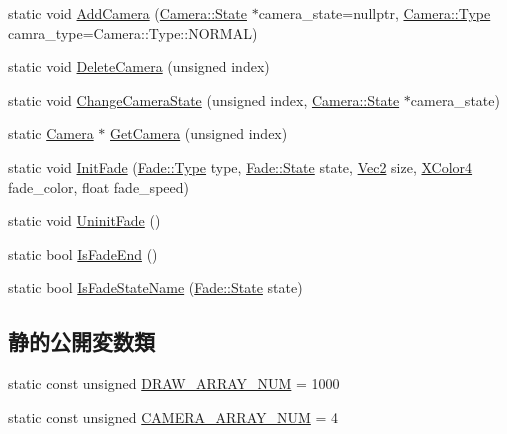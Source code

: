 \begin{DoxyCompactItemize}
\item 
static void \mbox{\hyperlink{class_draw_component_manager_a140f453f27122f3d9ea36f0c0b74dd99}{Add\+Camera}} (\mbox{\hyperlink{class_camera_1_1_state}{Camera\+::\+State}} $\ast$camera\+\_\+state=nullptr, \mbox{\hyperlink{class_camera_a3b0a1f58deca679ac665f61c480d1dcb}{Camera\+::\+Type}} camra\+\_\+type=Camera\+::\+Type\+::\+N\+O\+R\+M\+AL)
\item 
static void \mbox{\hyperlink{class_draw_component_manager_a577fc268235808a70610c9f2a9781c9d}{Delete\+Camera}} (unsigned index)
\item 
static void \mbox{\hyperlink{class_draw_component_manager_a78418e0716eadc2fad6288b555461e1d}{Change\+Camera\+State}} (unsigned index, \mbox{\hyperlink{class_camera_1_1_state}{Camera\+::\+State}} $\ast$camera\+\_\+state)
\item 
static \mbox{\hyperlink{class_camera}{Camera}} $\ast$ \mbox{\hyperlink{class_draw_component_manager_add448787d457fb884d0079cb2b9da0a5}{Get\+Camera}} (unsigned index)
\item 
static void \mbox{\hyperlink{class_draw_component_manager_ae4d6aae179ab380e40f2608dc89ac991}{Init\+Fade}} (\mbox{\hyperlink{class_fade_ac06f27215b454aa05b93c236476d6e80}{Fade\+::\+Type}} type, \mbox{\hyperlink{class_fade_ae77826bf3ff2ab95fb7b3b6f95cba80a}{Fade\+::\+State}} state, \mbox{\hyperlink{_vector3_d_8h_a5ef6e95dfc5f9d3820b71772d99bbc25}{Vec2}} size, \mbox{\hyperlink{_vector3_d_8h_a680c30c4a07d86fe763c7e01169cd6cc}{X\+Color4}} fade\+\_\+color, float fade\+\_\+speed)
\item 
static void \mbox{\hyperlink{class_draw_component_manager_a1c247650e83c572b4ae45152db468575}{Uninit\+Fade}} ()
\item 
static bool \mbox{\hyperlink{class_draw_component_manager_ae87bd98146d5a4a7323544114e543f50}{Is\+Fade\+End}} ()
\item 
static bool \mbox{\hyperlink{class_draw_component_manager_aaafe165dcb32ae65f4eaad94a4635807}{Is\+Fade\+State\+Name}} (\mbox{\hyperlink{class_fade_ae77826bf3ff2ab95fb7b3b6f95cba80a}{Fade\+::\+State}} state)
\end{DoxyCompactItemize}
\subsection*{静的公開変数類}
\begin{DoxyCompactItemize}
\item 
static const unsigned \mbox{\hyperlink{class_draw_component_manager_aa48e10b399a1d423f4e6896b69cfd213}{D\+R\+A\+W\+\_\+\+A\+R\+R\+A\+Y\+\_\+\+N\+UM}} = 1000
\item 
static const unsigned \mbox{\hyperlink{class_draw_component_manager_a27a861d3f771a93d85e872d8f205391e}{C\+A\+M\+E\+R\+A\+\_\+\+A\+R\+R\+A\+Y\+\_\+\+N\+UM}} = 4
\end{DoxyCompactItemize}


